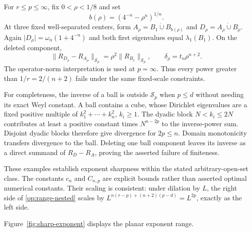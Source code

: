 \documentclass[11pt,reqno]{amsart}
\numberwithin{equation}{section}
\newcommand{\abs}[1]{\lvert#1\rvert}
\newcommand{\norm}[1]{\lVert#1\rVert}
\begin{document}
For $r\le p\le\infty$, fix $0<\rho<1/8$ and set
\[
 b(\rho)=(4^{-n}-\rho^n)^{1/n}.
\]
At three fixed well-separated centers, form
$A_\rho=B_1\mathbin{\dot\cup}B_{b(\rho)}$ and
$D_\rho=A_\rho\mathbin{\dot\cup}B_\rho$.
Again $\abs{D_\rho}=\omega_n(1+4^{-n})$ and both first
eigenvalues equal $\lambda_1(B_1)$.  On the deleted component,
\begin{equation}\label{op:one-ball}
 \norm{R_{D_\rho}-R_{A_\rho}}_{\mathcal S_p}
     =\rho^2\norm{R_{B_1}}_{\mathcal S_p},\qquad
 \delta_\rho=t_n\rho^{n+2}.
\end{equation}
The operator-norm interpretation is used at $p=\infty$.
Thus every power greater than $1/r=2/(n+2)$ fails under the
same fixed-scale constraints.

For completeness, the inverse of a ball is outside
$\mathcal S_p$ when $p\le d$ without needing its exact Weyl
constant.  A ball contains a cube, whose Dirichlet eigenvalues are a
fixed positive multiple of $k_1^2+\cdots+k_n^2$, $k_i\ge1$.
The dyadic block $N<k_i\le2N$ contributes at least a positive
constant times $N^{n-2p}$ to the inverse-power sum.  Disjoint
dyadic blocks therefore give divergence for $2p\le n$.
Domain monotonicity transfers divergence to the ball.  Deleting
one ball component leaves its inverse as a direct summand of
$R_D-R_A$, proving the asserted failure of finiteness.

These examples establish exponent sharpness within the stated
arbitrary-open-set class.  The constants $c_n$ and $C_{n,p}$ are
explicit bounds rather than asserted optimal numerical constants.
Their scaling is consistent: under dilation by $L$, the right side
of \eqref{op:range-nested} scales by
$L^{n(r-p)+(n+2)(p-d)}=L^{2p}$, exactly as the left side.

\noindent Figure~\ref{fig:sharp-exponent} displays the planar exponent range.
\end{document}
